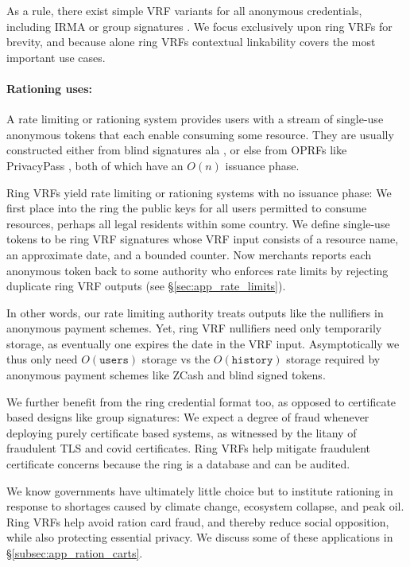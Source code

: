 As a rule, there exist simple VRF variants for all anonymous credentials,
including IRMA \cite{IRMAcredentials} or group signatures \cite{group_sig_survey}.
We focus exclusively upon ring VRFs for brevity, and because alone
ring VRFs contextual linkability covers the most important use cases.

\paragraph{Rationing uses:}

A rate limiting or rationing system provides users with a stream
of single-use anonymous tokens that each enable consuming some resource.
They are usually constructed either
from blind signatures ala \cite{chaum83}, or else
from OPRFs like PrivacyPass \cite{PrivacyPass},
both of which have an $O(n)$ issuance phase.

Ring VRFs yield rate limiting or rationing systems with no issuance phase:
We first place into the ring the public keys for all users permitted to
consume resources, perhaps all legal residents within some country.  
We define single-use tokens to be ring VRF signatures whose VRF input
consists of a resource name, an approximate date, and a bounded counter.
Now merchants reports each anonymous token back to some authority who
enforces rate limits by rejecting duplicate ring VRF outputs
(see \S\ref{sec:app_rate_limits}).

In other words, our rate limiting authority treats outputs like the
nullifiers in anonymous payment schemes.
Yet, ring VRF nullifiers need only temporarily storage, as eventually one
expires the date in the VRF input.  Asymptotically we thus only need
$O(\mathtt{users})$ storage vs the $O(\mathtt{history})$ storage
required by anonymous payment schemes like ZCash and blind signed tokens.

We further benefit from the ring credential format too,
as opposed to certificate based designs like group signatures:
We expect a degree of fraud whenever deploying purely certificate
based systems, as witnessed by the litany of fraudulent TLS and covid
certificates.  Ring VRFs help mitigate fraudulent certificate concerns
because the ring is a database and can be audited.

We know governments have ultimately little choice but to institute
rationing in response to shortages caused by climate change, ecosystem
collapse, and peak oil.  Ring VRFs help avoid ration card fraud,
and thereby reduce social opposition, while also protecting essential privacy. We discuss some of these 
applications in \S\ref{subsec:app_ration_carts}.
%

